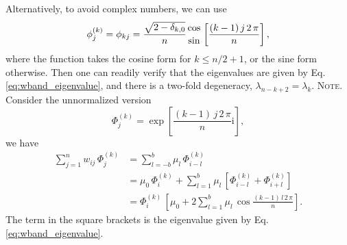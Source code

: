 \documentclass[reprint, superscriptaddress, floatfix]{revtex4-1}
\newcommand{\note}[1]{{\color{DarkGreen}\footnotesize \textsc{Note.} #1}}
\newcommand{\ii}{\mathrm{i}}
\begin{document}
Alternatively, to avoid complex numbers, we can use
%
\begin{equation}
  \phi^{(k)}_j
  =
  \phi_{kj}
  =
  \frac{ \sqrt{ 2 - \delta_{k,0} } } { n }
  {\cos \atop \sin}
  \left[
    \frac{ (k - 1) \, j \, 2 \, \pi }
         {            n             }
  \right]
  ,
  \notag
\end{equation}
%
where the function takes the cosine form for $k \le n/2 + 1$,
or the sine form otherwise.
%
Then one can readily verify that the eigenvalues are given by
  Eq. \eqref{eq:wband_eigenvalue},
  and there is a two-fold degeneracy,
  $\lambda_{n - k + 2} = \lambda_k$.
\note{Consider the unnormalized version
  $$
  \Phi^{(k)}_j =
  \exp\left[
    \frac{ ( k - 1 ) \, j \, 2 \, \pi }
         {              n             }
    \ii
  \right]
  ,
  $$
  we have
  $$
  \begin{aligned}
  \sum_{j = 1}^n
    w_{ij} \, \Phi^{(k)}_j
  &=
  \sum_{l = -b}^b
    \mu_l \, \Phi^{(k)}_{i - l}
  \\
  &=
  \mu_0 \, \Phi^{(k)}_i
  +
  \sum_{l = 1}^b
    \mu_l \,
    \left[ \Phi^{(k)}_{i - l} + \Phi^{(k)}_{i + l} \right]
  \\
  &=
  \Phi^{(k)}_i \,
  \left[
    \mu_0
    +
    2 \sum_{l = 1}^b
      \mu_l \, \cos
      \frac{ (k - 1) \, l \, 2 \, \pi }
           {            n             }
  \right]
  .
  \end{aligned}
  $$
  The term in the square brackets is the eigenvalue given by
  Eq. \eqref{eq:wband_eigenvalue}.
}
%
\end{document}
